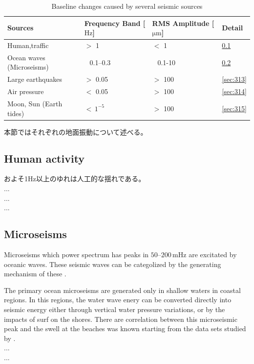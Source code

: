 \begin{table}[H]
  \centering
  \caption{Baseline changes caused by several seismic sources}
  \begin{tabular}{llll}
    \hline
    Sources & Frequency Band [$\mathrm{Hz}$]  & RMS Amplitude [$\mathrm{\mu m}$] & Detail\\
    \hline
    Human,traffic            & $>$ 1             & $<$ 1         & \cref{sec:311}\\
    Ocean waves (Microseisms)& $\ \ $ 0.1--0.3   & $\ \ $ 0.1-10 & \cref{sec:312}\\
    Large earthquakes        & $>$ 0.05          & $>$ 100       & \cref{sec:313}\\    
    Air pressure             & $<$ 0.05          & $>$ 100       & \cref{sec:314}\\
    Moon, Sun (Earth tides)  & $<\, 1^{-5}$      & $>$ 100       & \cref{sec:315}\\
    \hline
  \end{tabular}\label{tb:310}
\end{table}


本節ではそれぞれの地面振動について述べる。

\subsection{Human activity} \label{sec:311}
およそ1Hz以上のゆれは人工的な揺れである。
\\
...\\
...\\
...\\

\subsection{Microseisms} \label{sec:312}
Microseisms which power spectrum has peaks in $50$--$200\,\mathrm{mHz}$ are excitated by oceanic waves. These seismic waves can be categolized by the generating mechanism of these \cite{Bormann2012new}.

The primary ocean microseisms are generated only in shallow waters in coastal regions. In this regions, the water wave enery can be converted directly into seismic energy either through vertical water pressure variations, or by the impacts of surf on the shores. There are correlation between this microseismic peak and the swell at the beaches was known starting from the data sets studied by \cite{haubrich1963comparative}.
\\
...\\
...\\

